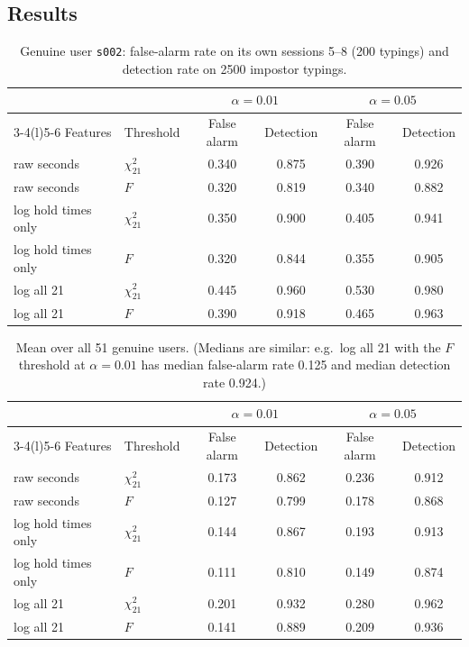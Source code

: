 \documentclass[11pt]{article}
\theoremstyle{definition}
\begin{document}
\subsection{Results}
\begin{table}[H]
\centering
\small
\begin{tabular}{@{}llcccc@{}}
\toprule
& & \multicolumn{2}{c}{$\alpha=0.01$} & \multicolumn{2}{c}{$\alpha=0.05$} \\
\cmidrule(lr){3-4}\cmidrule(l){5-6}
Features & Threshold & False alarm & Detection & False alarm & Detection \\
\midrule
raw seconds & $\chi^2_{21}$ & 0.340 & 0.875 & 0.390 & 0.926 \\
raw seconds & $F$ & 0.320 & 0.819 & 0.340 & 0.882 \\
log hold times only & $\chi^2_{21}$ & 0.350 & 0.900 & 0.405 & 0.941 \\
log hold times only & $F$ & 0.320 & 0.844 & 0.355 & 0.905 \\
log all 21 & $\chi^2_{21}$ & 0.445 & 0.960 & 0.530 & 0.980 \\
log all 21 & $F$ & 0.390 & 0.918 & 0.465 & 0.963 \\
\bottomrule
\end{tabular}
\caption{Genuine user \texttt{s002}: false-alarm rate on its own sessions 5--8 (200 typings) and detection rate on 2500 impostor typings.}
\label{tab:s002}
\end{table}

\begin{table}[H]
\centering
\small
\begin{tabular}{@{}llcccc@{}}
\toprule
& & \multicolumn{2}{c}{$\alpha=0.01$} & \multicolumn{2}{c}{$\alpha=0.05$} \\
\cmidrule(lr){3-4}\cmidrule(l){5-6}
Features & Threshold & False alarm & Detection & False alarm & Detection \\
\midrule
raw seconds & $\chi^2_{21}$ & 0.173 & 0.862 & 0.236 & 0.912 \\
raw seconds & $F$ & 0.127 & 0.799 & 0.178 & 0.868 \\
log hold times only & $\chi^2_{21}$ & 0.144 & 0.867 & 0.193 & 0.913 \\
log hold times only & $F$ & 0.111 & 0.810 & 0.149 & 0.874 \\
log all 21 & $\chi^2_{21}$ & 0.201 & 0.932 & 0.280 & 0.962 \\
log all 21 & $F$ & 0.141 & 0.889 & 0.209 & 0.936 \\
\bottomrule
\end{tabular}
\caption{Mean over all 51 genuine users. (Medians are similar: e.g.\ log all 21 with the $F$ threshold at $\alpha=0.01$ has median false-alarm rate 0.125 and median detection rate 0.924.)}
\label{tab:allusers}
\end{table}
\end{document}

